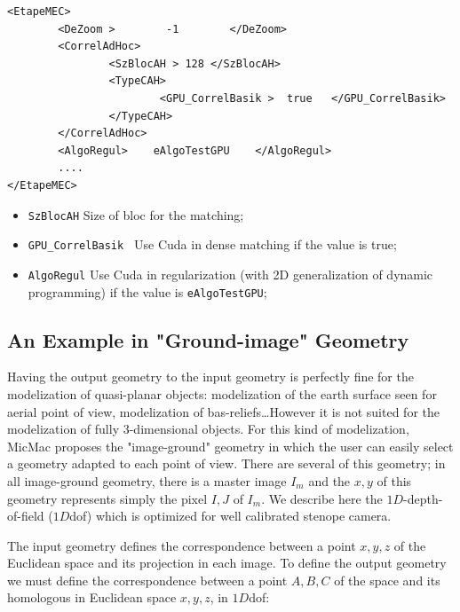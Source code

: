 {\scriptsize
\begin{verbatim}
<EtapeMEC>
        <DeZoom >        -1        </DeZoom>
        <CorrelAdHoc>
                <SzBlocAH > 128 </SzBlocAH>
                <TypeCAH>
                        <GPU_CorrelBasik >  true   </GPU_CorrelBasik>
                </TypeCAH>
        </CorrelAdHoc>
        <AlgoRegul>    eAlgoTestGPU    </AlgoRegul>
        ....
</EtapeMEC>
\end{verbatim}

\begin{itemize}

   \item  {\tt SzBlocAH} Size of bloc for the matching;
   
   \item  {\tt GPU\_CorrelBasik } Use Cuda in dense matching if the value is true;
   
   \item  {\tt AlgoRegul} Use Cuda in regularization (with 2D generalization of dynamic programming) if the value is {\tt eAlgoTestGPU};
   
\end{itemize}

}

\subsection{An Example in "Ground-image" Geometry}

\label{EX:TER:IM:GEOM}

Having the output geometry  to the input geometry is perfectly fine for the
modelization of quasi-planar objects: modelization of the earth surface seen for aerial
point of view, modelization of bas-reliefs\dots However it is not suited for the
modelization of fully 3-dimensional objects.  For this kind of modelization, MicMac
proposes the "image-ground" geometry in which the user can easily select a geometry
adapted to each point of view. There are several  of this geometry;
in all image-ground geometry, there is a master image $I_m$ and the $x,y$
of this geometry represents simply the pixel $I,J$ of $I_m$.
We describe here the $1D$-depth-of-field ($1D$dof)  which is optimized for well calibrated stenope camera.

The input geometry defines the correspondence between a point $x,y,z$ of
the Euclidean space and its projection in each image. To define the output
geometry we must define the correspondence between a point $A,B,C$ of
the  space and its homologous in Euclidean space $x,y,z$, in $1D$dof:

